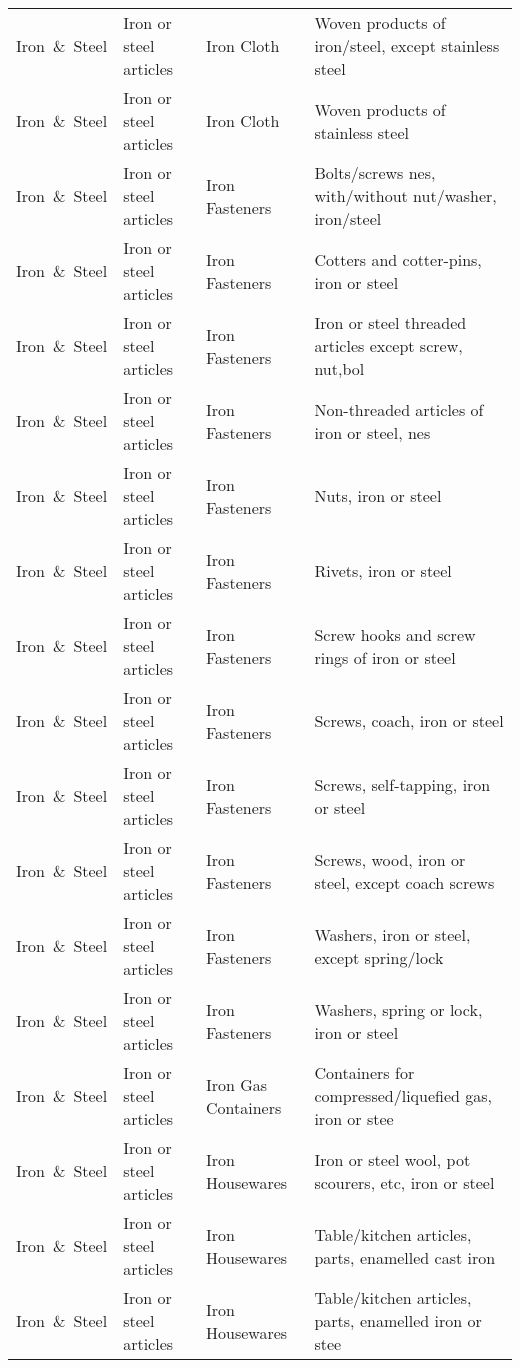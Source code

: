 \begin{appendices}
\begin{xltabular}{\textwidth}{|p{0.07\textwidth}|p{0.12\textwidth}|p{0.20\textwidth}|p{0.5\textwidth}|}
Iron\ \&\ Steel & Iron or steel articles & Iron Cloth & Woven products of iron/steel, except stainless steel \\
Iron\ \&\ Steel & Iron or steel articles & Iron Cloth & Woven products of stainless steel \\
Iron\ \&\ Steel & Iron or steel articles & Iron Fasteners & Bolts/screws nes, with/without nut/washer, iron/steel \\
Iron\ \&\ Steel & Iron or steel articles & Iron Fasteners & Cotters and cotter-pins, iron or steel \\
Iron\ \&\ Steel & Iron or steel articles & Iron Fasteners & Iron or steel threaded articles except screw, nut,bol \\
Iron\ \&\ Steel & Iron or steel articles & Iron Fasteners & Non-threaded articles of iron or steel, nes \\
Iron\ \&\ Steel & Iron or steel articles & Iron Fasteners & Nuts, iron or steel \\
Iron\ \&\ Steel & Iron or steel articles & Iron Fasteners & Rivets, iron or steel \\
Iron\ \&\ Steel & Iron or steel articles & Iron Fasteners & Screw hooks and screw rings of iron or steel \\
Iron\ \&\ Steel & Iron or steel articles & Iron Fasteners & Screws, coach, iron or steel \\
Iron\ \&\ Steel & Iron or steel articles & Iron Fasteners & Screws, self-tapping, iron or steel \\
Iron\ \&\ Steel & Iron or steel articles & Iron Fasteners & Screws, wood, iron or steel, except coach screws \\
Iron\ \&\ Steel & Iron or steel articles & Iron Fasteners & Washers, iron or steel, except spring/lock \\
Iron\ \&\ Steel & Iron or steel articles & Iron Fasteners & Washers, spring or lock, iron or steel \\
Iron\ \&\ Steel & Iron or steel articles & Iron Gas Containers & Containers for compressed/liquefied gas, iron or stee \\
Iron\ \&\ Steel & Iron or steel articles & Iron Housewares & Iron or steel wool, pot scourers, etc, iron or steel \\
Iron\ \&\ Steel & Iron or steel articles & Iron Housewares & Table/kitchen articles, parts, enamelled cast iron \\
Iron\ \&\ Steel & Iron or steel articles & Iron Housewares & Table/kitchen articles, parts, enamelled iron or stee \\

\end{xltabular}
\end{appendices}
